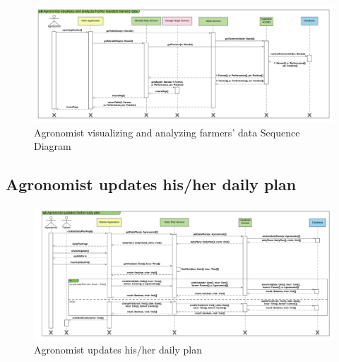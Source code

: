 \newpage
\begin{landscape}
\begin{figure}[h]
\vspace*{-2cm}
\noindent
\centering
\centerline{\includegraphics[scale= 0.108]{./Images/Sequence diagram/Agronomist visualizes and analyzes his_her mandal's farmers' data.png}}
    \caption{Agronomist visualizing and analyzing farmers' data Sequence Diagram}
    \vspace*{-12cm}
\end{figure}
\fillandplacepagenumber
\end{landscape}

\subsection{Agronomist updates his/her daily plan}

\newpage
\begin{landscape}
\begin{figure}[h]
\vspace*{-2cm}
\noindent
\centering
\centerline{\includegraphics[scale= 0.108]{./Images/Sequence diagram/Agronomist updates his_her daily plan.png}}
    \caption{Agronomist updates his/her daily plan}
    \vspace*{-12cm}
\end{figure}
\fillandplacepagenumber
\end{landscape}


